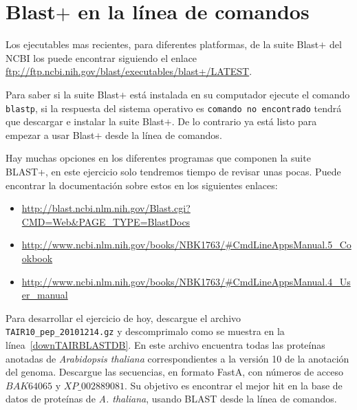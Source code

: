 \documentclass[letter,11pt]{book}
\begin{document}
\section{Blast$+$ en la línea de comandos}\label{BlastCLI}

Los ejecutables mas recientes, para diferentes platformas, de la suite Blast$+$ del NCBI los puede encontrar siguiendo el enlace \url{ftp://ftp.ncbi.nih.gov/blast/executables/blast+/LATEST}.

Para saber si la suite Blast$+$ está instalada en su computador ejecute el comando \Verb+blastp+, si la respuesta del sistema operativo es \Verb+comando no encontrado+ tendrá que descargar e instalar la suite Blast$+$. De lo contrario ya está listo para empezar a usar Blast$+$ desde la línea de comandos. 

Hay muchas opciones en los diferentes programas que componen la suite BLAST+, en este ejercicio solo tendremos tiempo de revisar unas pocas. Puede encontrar la documentación sobre estos en los siguientes enlaces:

\begin{itemize}
\item \url{http://blast.ncbi.nlm.nih.gov/Blast.cgi?CMD=Web&PAGE_TYPE=BlastDocs}
\item \url{http://www.ncbi.nlm.nih.gov/books/NBK1763/#CmdLineAppsManual.5_Cookbook}
\item \url{http://www.ncbi.nlm.nih.gov/books/NBK1763/#CmdLineAppsManual.4_User_manual}
\end{itemize}

Para desarrollar el ejercicio de hoy, descargue el archivo \Verb+TAIR10_pep_20101214.gz+ y descomprimalo como se muestra en la línea~\ref{downTAIRBLASTDB}. En este archivo encuentra todas las proteínas anotadas de \textit{Arabidopsis thaliana} correspondientes a la versión 10 de la anotación del genoma. Descargue las secuencias, en formato FastA, con números de acceso $BAK64065$ y $XP\_002889081$. Su objetivo es encontrar el mejor hit en la base de datos de proteínas de \textit{A. thaliana}, usando BLAST desde la línea de comandos.
\end{document}

